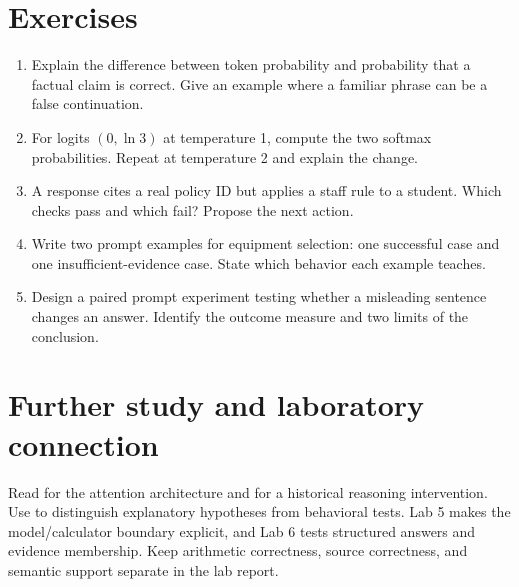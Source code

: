 \section{Exercises}
\begin{enumerate}
\item Explain the difference between token probability and probability that a factual claim is correct. Give an example where a familiar phrase can be a false continuation.
\item For logits \((0,\ln 3)\) at temperature 1, compute the two softmax probabilities. Repeat at temperature 2 and explain the change.
\item A response cites a real policy ID but applies a staff rule to a student. Which checks pass and which fail? Propose the next action.
\item Write two prompt examples for equipment selection: one successful case and one insufficient-evidence case. State which behavior each example teaches.
\item Design a paired prompt experiment testing whether a misleading sentence changes an answer. Identify the outcome measure and two limits of the conclusion.
\end{enumerate}

\section{Further study and laboratory connection}
Read \cite{transformer} for the attention architecture and \cite{cot} for a historical reasoning intervention. Use \cite{chive} to distinguish explanatory hypotheses from behavioral tests. Lab 5 makes the model/calculator boundary explicit, and Lab 6 tests structured answers and evidence membership. Keep arithmetic correctness, source correctness, and semantic support separate in the lab report.

